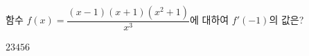 함수 $f(x)=\dfrac{(x-1)(x+1)(x^2+1)}{x^3}$에 대하여 $f'(-1)$의 값은?
\begin{choices32}{$2$}{$3$}{$4$}{$5$}{$6$}\end{choices32}
